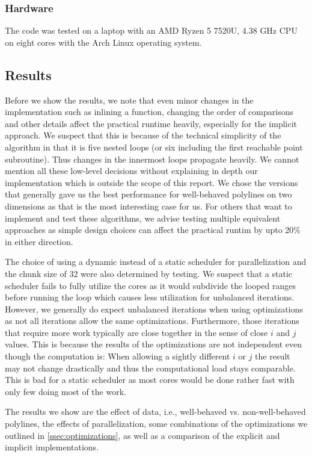 \subsubsection{Hardware}
\label{subsubsec:hardware}
The code was tested on a laptop with an AMD Ryzen 5 7520U, 4.38 GHz CPU on eight cores with the Arch Linux operating system.


\subsection{Results}
\label{subsec:results}
Before we show the results, we note that even minor changes in the implementation such as inlining a function, changing the order of comparisons and other details affect the practical runtime heavily, especially for the implicit approach. We suspect that this is because of the technical simplicity of the algorithm in that it is five nested loops (or six including the first reachable point subroutine). Thus changes in the innermost loops propagate heavily. We cannot mention all these low-level decisions without explaining in depth our implementation which is outside the scope of this report. We chose the versions that generally gave us the best performance for well-behaved polylines on two dimensions as that is the most interesting case for us. For others that want to implement and test these algorithms, we advise testing multiple equivalent approaches as simple design choices can affect the practical runtim by upto 20\% in either direction. 

The choice of using a dynamic instead of a static scheduler for parallelization and the chunk size of \(32\) were also determined by testing. We suspect that a static scheduler fails to fully utilize the cores as it would subdivide the looped ranges before running the loop which causes less utilization for unbalanced iterations. However, we generally do expect unbalanced iterations when using optimizations as not all iterations allow the same optimizations. Furthermore, those iterations that require more work typically are close together in the sense of close \(i\) and \(j\) values. This is because the results of the optimizations are not independent even though the computation is: When allowing a sightly different \(i\) or \(j\) the result may not change drastically and thus the computational load stays comparable. This is bad for a static scheduler as most cores would be done rather fast with only few doing most of the work. 

The results we show are the effect of data, i.e., well-behaved vs. non-well-behaved polylines, the effects of parallelization, some combinations of the optimizations we outlined in \cref{ssec:optimizations}, as well as a comparison of the explicit and implicit implementations. 

